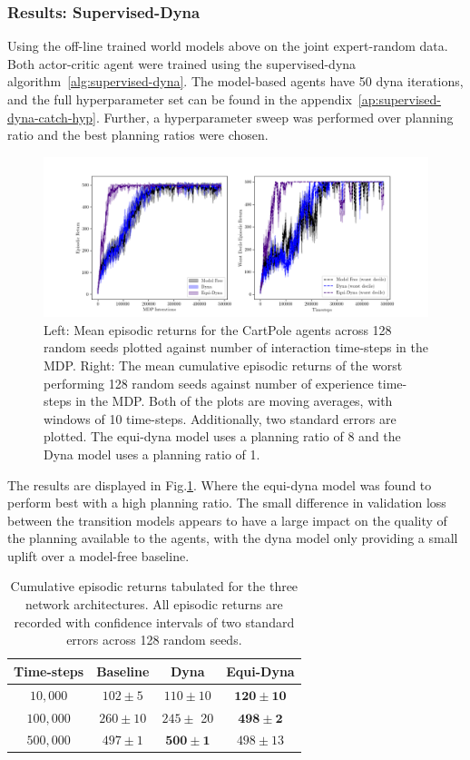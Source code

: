 \subsubsection{Results: Supervised-Dyna}
Using the off-line trained world models above on the joint expert-random data. Both actor-critic agent were trained using the supervised-dyna algorithm~\ref{alg:supervised-dyna}. The model-based agents have 50 dyna iterations, and the full hyperparameter set can be found in the appendix~\ref{ap:supervised-dyna-catch-hyp}. Further, a hyperparameter sweep was performed over planning ratio and the best planning ratios were chosen.
\begin{figure}\label{fig:supervised-dyna-cp}
	\centering
	\includegraphics[width=\textwidth]{Figures/Expert_dyna_cp_best.png}
	\caption{Left: Mean episodic returns for the CartPole agents across 128 random seeds
		plotted against number of interaction time-steps in the MDP. Right: The mean
		cumulative episodic returns of the worst performing 128 random seeds against
		number of experience time-steps in the MDP. Both of the plots are moving
		averages, with windows of 10 time-steps. Additionally, two standard errors are
		plotted. The equi-dyna model uses a planning ratio of 8 and the Dyna model uses a planning ratio of 1.}
\end{figure}
The results are displayed in Fig.\ref{fig:supervised-dyna-cp}. Where the equi-dyna model was found to perform best with a high planning ratio. The small difference in validation loss between the transition models appears to have a large impact on the quality of the planning available to the agents, with the dyna model only providing a small uplift over a model-free baseline.
\begin{table}
	\centering
	\begin{tabular}{|c|c|c|c|}
		\hline
		Time-steps & Baseline     & Dyna                 & Equi-Dyna             \\
		\hline
		$10, 000$  & $102 \pm 5$  & $110 \pm 10$         & $\mathbf{120 \pm 10}$ \\
		$100, 000$ & $260 \pm 10$ & $245 \pm$ 20         & $\mathbf{498 \pm 2}$  \\
		$500,000$  & $497 \pm 1$  & $\mathbf{500 \pm 1}$ & $498 \pm 13$          \\
		\hline
	\end{tabular}
	\caption{Cumulative episodic returns tabulated for the three network architectures. All episodic returns are recorded with confidence intervals of two standard errors across 128 random seeds.}
	\label{tab:supervised-dyna-cp}
\end{table}

